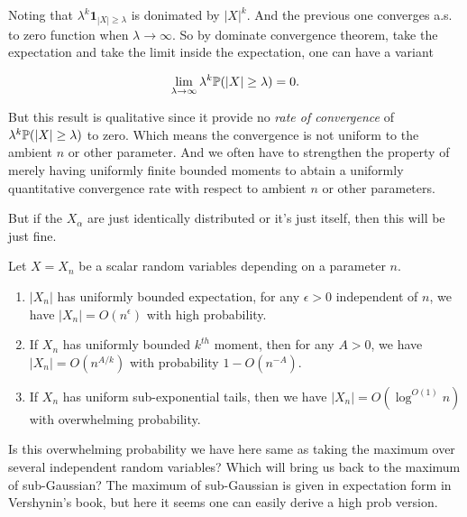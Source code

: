 Noting that $\lambda^k \mathbf 1_{|X|\geq\lambda}$ is donimated by $|X|^k$. And the previous one converges a.s. to zero function when $\lambda\to \infty$. 
So by dominate convergence theorem, take the expectation and take the limit inside the expectation, one can have a variant

\begin{equation}
    \lim_{\lambda\to\infty} \lambda^k \mathbb{P}(|X|\geq \lambda) = 0.
\end{equation}

But this result is qualitative since it provide no \textit{rate of convergence} of $\lambda^k \mathbb{P}(|X|\geq \lambda)$ to zero. 
Which means the convergence is not uniform to the ambient $n$ or other parameter. 
And we often have to strengthen the property of merely having uniformly finite bounded moments to abtain a uniformly quantitative convergence rate with respect to ambient $n$ or other parameters.

But if the $X_\alpha$ are just identically distributed or it's just itself, then this will be just fine.

\begin{lemma}
    Let $X = X_n$ be a scalar random variables depending on a parameter $n$.
    \begin{enumerate}
        \item $|X_n|$ has uniformly bounded expectation, for any $\epsilon>0$ independent of $n$, we have $|X_n| = O(n^{\epsilon})$ with high probability.
        \item If $X_n$ has uniformly bounded $k^{th}$ moment, then for any $A>0$, we have $|X_n|=O(n^{A/k})$ with probability $1-O(n^{-A})$. %
        \item If $X_n$ has uniform sub-exponential tails, then we have $|X_n|=O(\log^{O(1)}n)$ with overwhelming probability. 
    \end{enumerate}
\end{lemma}

Is this overwhelming probability we have here same as taking the maximum over several independent random variables? 
Which will bring us back to the maximum of sub-Gaussian? 
The maximum of sub-Gaussian is given in expectation form in Vershynin's book, but here it seems one can easily derive a high prob version.



